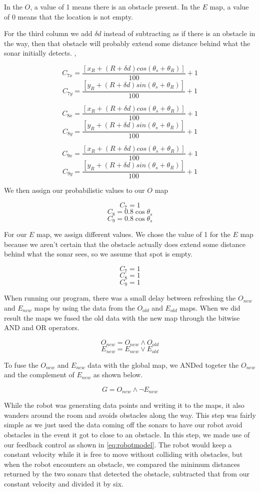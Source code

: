 \documentclass[12pt]{article}
\begin{document}
In the $O$, a value of 1 means there is an obstacle present. In the $E$ map, a value of 0 means that the location is not empty.

For the third column we add $\delta{d}$ instead of subtracting as if there is an obstacle in the way, then that obstacle will probably extend some distance behind what the sonar initially detects. ,  

\[C_{7x} = \frac{[ x_R + (R + \delta{d}) cos(\theta_s + \theta_R)]}{100} + 1 \]
\[C_{7y} = \frac{[ y_R + (R + \delta{d}) sin(\theta_s + \theta_R)]}{100} + 1 \]

\[C_{8x} = \frac{[ x_R + (R + \delta{d}) cos(\theta_s + \theta_R)]}{100} + 1 \]
\[C_{8y} = \frac{[ y_R + (R + \delta{d}) sin(\theta_s + \theta_R)]}{100} + 1 \]

\[C_{9x} = \frac{[ x_R + (R + \delta{d}) cos(\theta_s + \theta_R)]}{100} + 1 \]
\[C_{9y} = \frac{[ y_R + (R + \delta{d}) sin(\theta_s + \theta_R)]}{100} + 1 \]

We then assign our probabilistic values to our $O$ map

\[ C_7 = 1 \]
\[ C_8 = 0.8\cos\theta_s \]
\[ C_9 = 0.8\cos\theta_s \]

For our $E$ map, we assign different values. We chose the value of 1 for the $E$ map because we aren't certain that the obstacle actually does extend some distance behind what the sonar sees, so we assume that spot is empty.

\[ C_7 = 1 \]
\[ C_8 = 1 \]
\[ C_9 = 1 \]

When running our program, there was a small delay between refreshing the $O_{new}$ and $E_{new}$ maps by using the data from the $O_{old}$ and $E_{old}$ maps. When we did result the maps we fused the old data with the new map through the bitwise AND and OR operators.

\[ O_{new} = O_{new} \wedge O_{old} \]
\[ E_{new} = E_{new} \vee E_{old} \]

To fuse the $O_{new}$ and $E_{new}$ data with the global map, we ANDed togeter the $O_{new}$ and the complement of $E_{new}$ as shown below.

\[ G = O_{new} \wedge \neg{E_{new}} \]

While the robot was generating data points and writing it to the maps, it also wanders around the room and avoids obstacles along the way. This step was fairly simple as we just used the data coming off the sonars to have our robot avoid obstacles in the event it got to close to an obstacle. In this step, we made use of our feedback control as shown in \ref{eq:robotmodel}. The robot would keep a constant velocity while it is free to move without colliding with obstacles, but when the robot encounters an obstacle, we compared the minimum distances returned by the two sonars that detected the obstacle, subtracted that from our constant velocity and divided it by six.
\end{document}

